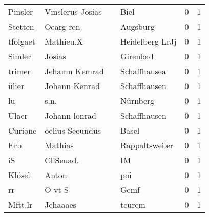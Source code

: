 \begin{tabular}{llllrr}
                  Pinsler &                   Vinslerus Josias &             &                                        Biel &          0 &         1 \\
                  Stetten &                          Oearg ren &             &                                    Augsburg &          0 &         1 \\
                 tfolgaet &                          Mathieu.X &             &                             Heidelberg LrJj &          0 &         1 \\
                   Simler &                             Josias &             &                                    Girenbad &          0 &         1 \\
                   trimer &                      Jehamn Kemrad &             &                                Schaffhausea &          0 &         1 \\
                    ülier &                      Johann Kenrad &             &                                Schaffhausen &          0 &         1 \\
                       lu &                               s.n. &             &                                    Nürnberg &          0 &         1 \\
                    Ulaer &                      Johann lonrad &             &                                Schaffhausen &          0 &         1 \\
                  Curione &                    oelius Seeundus &             &                                       Basel &          0 &         1 \\
                      Erb &                            Mathias &             &                              Rappaltsweiler &          0 &         1 \\
                       iS &                          CliSeuad. &             &                                          IM &          0 &         1 \\
                   Klösel &                              Anton &             &                                         poi &          0 &         1 \\
                       rr &                             O vt S &             &                                        Gemf &          0 &         1 \\
                  Mftt.lr &                           Jehaaaes &             &                                      teurem &          0 &         1 \\

\end{tabular}
